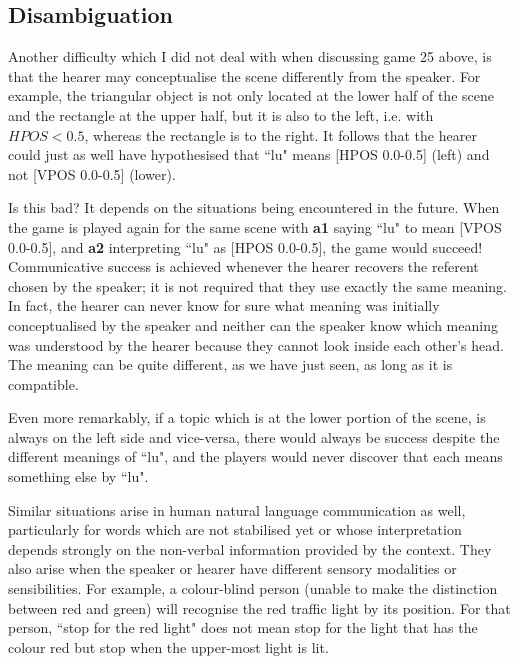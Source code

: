 \subsection{Disambiguation}

Another difficulty which I did not deal with when discussing game 25 above,
is that the hearer may conceptualise
the scene differently from the speaker. For example, 
the triangular object is not only located at the lower half
of the scene and the rectangle at the upper half, 
but it is also to the left, i.e. with $HPOS < 0.5$, whereas
the rectangle is to the right. It follows that the 
hearer could just as well have hypothesised that ``lu" means [HPOS 0.0-0.5] (left)
and not [VPOS 0.0-0.5] (lower). 

Is this bad? It depends on the situations being encountered
in the future. When the game is played again for the
same scene with {\bf a1} saying ``lu" to mean [VPOS 0.0-0.5], and 
{\bf a2} interpreting ``lu" as [HPOS 0.0-0.5], the game would succeed! 
Communicative success is achieved whenever the 
hearer recovers the referent chosen by the 
speaker; it is not required that they 
use exactly the same meaning. In fact, the hearer can never know
for sure what meaning was initially conceptualised by the speaker and 
neither can the speaker know which meaning was understood 
by the hearer because they cannot look inside each
other's head. The meaning can be quite different, 
as we have just seen, as long as it is compatible. 

Even more remarkably, if a topic which is at the lower
portion of the scene, is always 
on the left side and vice-versa, there would always be 
success despite the different meanings of ``lu", 
and the players would never discover
that each means something else by ``lu". 

Similar situations arise in human natural language communication
as well, particularly for words
which are not stabilised yet or whose interpretation 
depends strongly on the non-verbal information provided
by the context. They also arise when the speaker or hearer
have different sensory modalities or sensibilities. 
For example, a colour-blind person (unable to 
make the distinction between red and green) will recognise
the red traffic light by its position. For that person, 
``stop for the red light" does not mean stop for 
the light that has the colour red but stop when the 
upper-most light is lit. 


